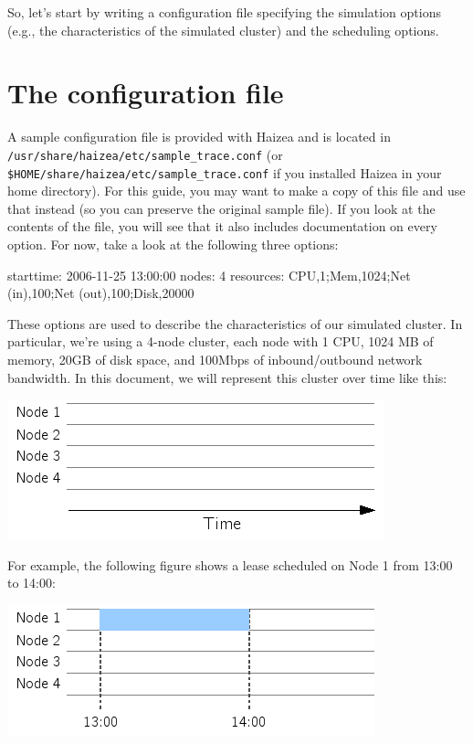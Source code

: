 So, let's start by writing a configuration file specifying the simulation options (e.g., the characteristics of the simulated cluster) and the scheduling options.

\section{The configuration file}

A sample configuration file is provided with Haizea and is located in \texttt{/usr/share/haizea/etc/sample\_trace.conf} (or \texttt{\$HOME/share/haizea/etc/sample\_trace.conf} if you installed Haizea in your home directory). For this guide, you may want to make a copy of this file and use that instead (so you can preserve the original sample file). If you look at the contents of the file, you will see that it also includes documentation on every option. For now, take a look at the following three options:

\begin{wideshellverbatim}
[simulation]
starttime: 2006-11-25 13:00:00
nodes: 4
resources: CPU,1;Mem,1024;Net (in),100;Net (out),100;Disk,20000
\end{wideshellverbatim}

These options are used to describe the characteristics of our simulated cluster. In particular, we're using a 4-node cluster, each node with 1 CPU, 1024 MB of memory, 20GB of disk space, and 100Mbps of inbound/outbound network bandwidth. In this document, we will represent this cluster over time like this:

\begin{center}
\includegraphics{images/quickstart_leasegraph1.png}
\end{center}

For example, the following figure shows a lease scheduled on Node 1 from 13:00 to 14:00:

\begin{center}
\includegraphics{images/quickstart_leasegraph2.png}
\end{center}

